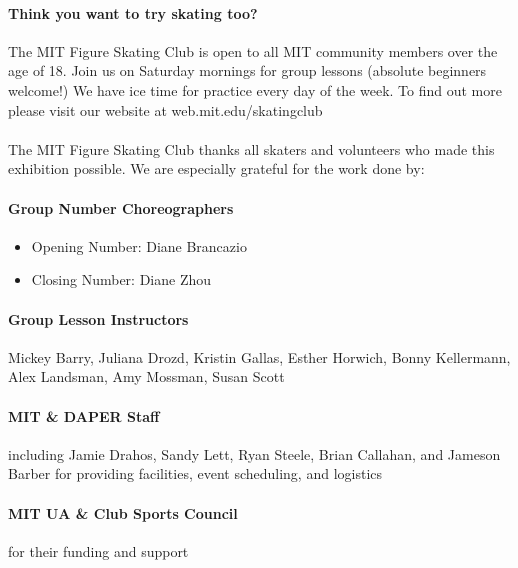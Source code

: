 \documentclass[12pt]{article}
\begin{document}
\begin{multicols*}{2}


\paragraph{Think you want to try skating too?} The MIT Figure Skating Club is open to all MIT community members over the age of 18. Join us on Saturday mornings for group lessons (absolute beginners welcome!) We have ice time for practice every day of the week. To find out more please visit our website at web.mit.edu/skatingclub

\paragraph{} The MIT Figure Skating Club thanks all skaters and volunteers who made this exhibition possible. We are especially grateful for the work done by:

\paragraph{Group Number Choreographers}
\begin{itemize}
    \item Opening Number: Diane Brancazio
    \item Closing Number: Diane Zhou
\end{itemize}

\paragraph{Group Lesson Instructors} Mickey Barry, Juliana Drozd, Kristin Gallas, Esther Horwich, Bonny Kellermann, Alex Landsman, Amy Mossman, Susan Scott
\paragraph{MIT \& DAPER Staff} including Jamie Drahos, Sandy Lett, Ryan Steele, Brian Callahan, and Jameson Barber for providing facilities, event scheduling, and logistics
\paragraph{MIT UA \& Club Sports Council} for their funding and support

\vfill\null
\columnbreak



\end{multicols*}
\end{document}
